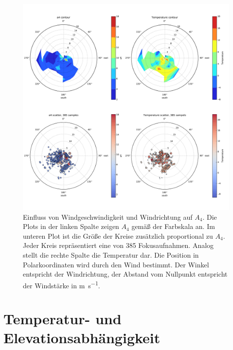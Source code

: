 \begin{figure}[h]
	\centering
	\includegraphics[scale=.48]{wind/wind_a4.pdf}
	\caption[Einfluss von Windgeschwindigkeit und Windrichtung auf $A_4$]{Einfluss von Windgeschwindigkeit und Windrichtung auf $A_4$. Die Plots in der linken Spalte zeigen $A_4$ gemäß der Farbskala an. Im unteren Plot ist die Größe der Kreise zusätzlich proportional zu $A_4$. Jeder Kreis repräsentiert eine von 385 Fokusaufnahmen. Analog stellt die rechte Spalte die Temperatur dar. Die Position in Polarkoordinaten wird durch den Wind bestimmt. Der Winkel entspricht der Windrichtung, der Abstand vom Nullpunkt entspricht der Windstärke in \si{\metre\per\second}.}
    \label{wind_a4}
\end{figure}

\section{Temperatur- und Elevationsabhängigkeit}

